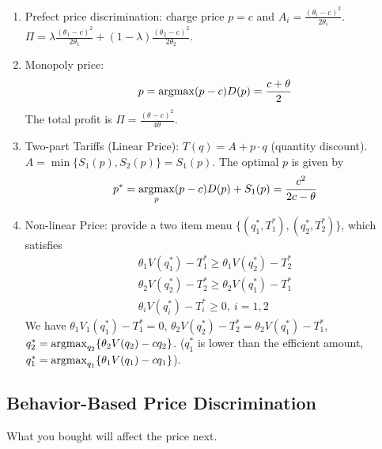 \documentclass[11pt]{elegantbook}
\newcommand{\argmax}{\operatornamewithlimits{argmax}}
\begin{document}
\begin{enumerate}
    \item Prefect price discrimination: charge price $p=c$ and $A_i=\frac{(\theta_i-c)^2}{2\theta_i}$. $\Pi=\lambda \frac{(\theta_1-c)^2}{2\theta_1}+\left(1-\lambda\right)\frac{(\theta_2-c)^2}{2\theta_2}$.
    \item Monopoly price: $$p=\argmax (p-c)D(p)=\frac{c+\theta}{2}$$
    The total profit is $\Pi=\frac{(\theta-c)^2}{4\theta}$.
    \item Two-part Tariffs (Linear Price): $T(q)=A+p\cdot q$ (quantity discount). $A=\min\{S_1(p),S_2(p)\}=S_1(p)$. The optimal $p$ is given by
    \begin{equation}
        \begin{aligned}
            p^*=\argmax_{p} (p-c)D(p)+S_1(p)=\frac{c^2}{2c-\theta}
        \end{aligned}
        \nonumber
    \end{equation}
    \item Non-linear Price: provide a two item menu $\{(q_1^*,T_1^*),(q_2^*,T_2^*)\}$, which satisfies
    \begin{equation}
        \begin{aligned}
            \theta_1 V(q_1^*)-T_1^*\geq\theta_1 V(q_2^*)-T_2^*\\
            \theta_2 V(q_2^*)-T_2^*\geq\theta_2 V(q_1^*)-T_1^*\\
            \theta_i V(q_i^*)-T_i^*\geq 0,\ i=1,2
        \end{aligned}
        \nonumber
    \end{equation}
    We have $\theta_1 V_1(q_1^*)-T_1^*=0$, $\theta_2 V(q_2^*)-T_2^*=\theta_2 V(q_1^*)-T_1^*$, $q_2^*=\argmax_{q_2}\{\theta_2 V(q_2)-c q_2\}$. ($q_1^*$ is lower than the efficient amount, $q_1^*=\argmax_{q_1}\{\theta_1 V(q_1)-c q_1\}$).
\end{enumerate}

\subsection{Behavior-Based Price Discrimination}
What you bought will affect the price next.
\end{document}
